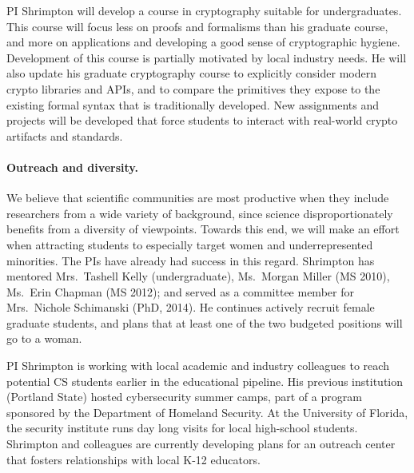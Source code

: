 PI Shrimpton will develop a course in cryptography suitable for undergraduates.  This course will focus less on proofs and
formalisms than his graduate course, and more on applications and developing a good sense of
cryptographic hygiene.  Development of this course is partially
motivated by local industry needs.  
%
He will also update his graduate
cryptography course to explicitly consider modern crypto libraries and
APIs, and to compare the primitives they expose to the existing formal
syntax that is traditionally developed.  New assignments and projects
will be developed that force students to interact with real-world
crypto artifacts and standards.

\paragraph{Outreach and diversity.} We believe that scientific
communities are most productive when they include researchers from a wide
variety of background, since science disproportionately benefits from a diversity of
viewpoints.  Towards this end,  we will make an effort when attracting students
to especially target women and underrepresented minorities.  The PIs have
already had success in this regard.  Shrimpton has mentored Mrs.\ Tashell
Kelly (undergraduate), 
Ms.\ Morgan Miller (MS 2010), Ms.\ Erin Chapman (MS 2012); 
and served as a committee member for Mrs.\ Nichole Schimanski (PhD,
2014).  He continues actively recruit female graduate students, and
plans that at least one of the two budgeted positions will go to a woman.

PI Shrimpton is working with local academic and industry colleagues 
to reach potential CS students earlier in the educational pipeline.
His previous institution (Portland
State) hosted cybersecurity summer camps, part of a program
sponsored by the Department of Homeland Security.  At the University
of Florida, the security institute runs day long visits for local
high-school students.  Shrimpton and colleagues
are currently developing plans for an outreach center that fosters 
relationships with local K-12 educators. 

